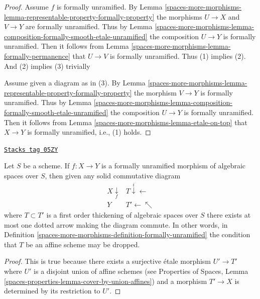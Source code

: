 \begin{proof}
Assume $f$ is formally unramified. By
Lemma \ref{spaces-more-morphisms-lemma-representable-property-formally-property}
the morphisms $U \to X$ and $V \to Y$ are formally unramified. Thus by
Lemma \ref{spaces-more-morphisms-lemma-composition-formally-smooth-etale-unramified}
the composition $U \to Y$ is formally unramified. Then it follows from
Lemma \ref{spaces-more-morphisms-lemma-formally-permanence}
that $U \to V$ is formally unramified. Thus (1) implies (2). And (2)
implies (3) trivially

\medskip\noindent
Assume given a diagram as in (3). By
Lemma \ref{spaces-more-morphisms-lemma-representable-property-formally-property}
the morphism $V \to Y$ is formally unramified. Thus by
Lemma \ref{spaces-more-morphisms-lemma-composition-formally-smooth-etale-unramified}
the composition $U \to Y$ is formally unramified. Then it follows from
Lemma \ref{spaces-more-morphisms-lemma-etale-on-top}
that $X \to Y$ is formally unramified, i.e., (1) holds.
\end{proof}

\begin{lemma}
\label{spaces-more-morphisms-lemma-formally-unramified-not-affine}
\href{https://stacks.math.columbia.edu/tag/05ZY}{\texttt{Stacks tag 05ZY}}

Let $S$ be a scheme.
If $f : X \to Y$ is a formally unramified morphism of algebraic spaces
over $S$, then given any solid commutative diagram
$$
\begin{array}{cc}X \underset{f}{\downarrow} & T \overset{i}{\downarrow}\longleftarrow \\ Y & T' \longleftarrow\nwarrow\end{array}
$$
where $T \subset T'$ is a first order thickening of algebraic spaces
over $S$ there exists at most one dotted arrow making the diagram commute.
In other words, in
Definition \ref{spaces-more-morphisms-definition-formally-unramified}
the condition that $T$ be an affine scheme may be dropped.
\end{lemma}

\begin{proof}
This is true because there exists a surjective \'etale morphism
$U' \to T'$ where $U'$ is a disjoint union of affine schemes (see
Properties of Spaces, Lemma
\ref{spaces-properties-lemma-cover-by-union-affines})
and a morphism $T' \to X$ is determined by its restriction to $U'$.
\end{proof}

